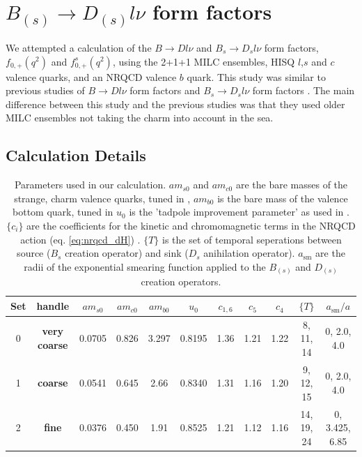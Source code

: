 \section{$B_{(s)}\to D_{(s)}l\nu$ form factors}
\label{sec:BD_BsDs_nrqcd}

We attempted a calculation of the $B\to Dl\nu$ and $B_{s}\to D_{s}l\nu$ form factors, $f_{0,+}(q^2)$ and $f^s_{0,+}(q^2)$, using the 2+1+1 MILC ensembles, HISQ $l$,$s$ and $c$ valence quarks, and an NRQCD valence $b$ quark. This study was similar to previous studies of $B\to Dl\nu$ form factors \cite{Na:2015kha} and $B_s\to D_sl\nu$ form factors \cite{Monahan:2017uby}. The main difference between this study and the previous studies was that they used older MILC ensembles not taking the charm into account in the sea.

\subsection{Calculation Details}

\begin{table}[htb!]
\hspace{-40pt}
 \begin{tabular}{c c c c c c c c c c c}
 \hline
 Set & handle & $am_{s0}$ & $am_{c0}$ & $am_{b0}$ & $u_0$ & $c_{1,6}$ & $c_5$ & $c_4$ & $\{T\}$ & $a_{\text{sm}}/a$ \\ [0.5ex] 
 \hline
 0 & {\textbf{very coarse}} & 0.0705 & 0.826 & 3.297 & 0.8195 & 1.36 & 1.21 & 1.22 & 8, 11, 14 & 0, 2.0, 4.0 \\ [1ex]
 1 & {\textbf{coarse}} & 0.0541 & 0.645 & 2.66 & 0.8340 & 1.31 & 1.16 & 1.20 & 9, 12, 15 & 0, 2.0, 4.0 \\ [1ex]
 2 & {\textbf{fine}} & 0.0376 & 0.450 & 1.91 & 0.8525 &  1.21 & 1.12 & 1.16 & 14, 19, 24 & 0, 3.425, 6.85 \\ [1ex]
 \hline
\end{tabular}
 \caption{Parameters used in our calculation. $am_{s0}$ and $am_{c0}$ are the bare masses of the strange, charm valence quarks, tuned in \cite{PhysRevD.91.054508}, $am_{b0}$ is the bare mass of the valence bottom quark, tuned in \cite{Dowdall:2011wh} $u_0$ is the 'tadpole improvement parameter' as used in \cite{Dowdall:2011wh}. $\{c_i\}$ are the coefficients for the kinetic and chromomagnetic terms in the NRQCD action (eq. \eqref{eq:nrqcd_dH}) \cite{Hammant:2013sca}. $\{T\}$ is the set of temporal seperations between source ($B_s$ creation operator) and sink ($D_s$ anihilation operator). $a_{\text{sm}}$ are the radii of the exponential smearing function applied to the $B_{(s)}$ and $D_{(s)}$ creation operators.
   \label{tab:quarkmasses}}
\end{table}

